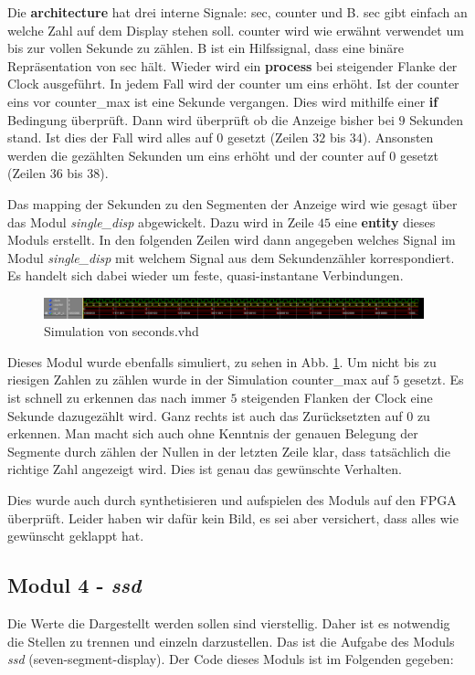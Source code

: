 Die \textbf{architecture} hat drei interne Signale: sec, counter und B.
sec gibt einfach an welche Zahl auf dem Display stehen soll.
counter wird wie erwähnt verwendet um bis zur vollen Sekunde zu zählen.
B ist ein Hilfssignal, dass eine binäre Repräsentation von sec hält.
Wieder wird ein \textbf{process} bei steigender Flanke der Clock ausgeführt.
In jedem Fall wird der counter um eins erhöht.
Ist der counter eins vor counter\_max ist eine Sekunde vergangen.
Dies wird mithilfe einer \textbf{if} Bedingung überprüft.
Dann wird überprüft ob die Anzeige bisher bei $9$ Sekunden stand.
Ist dies der Fall wird alles auf $0$ gesetzt (Zeilen $32$ bis $34$).
Ansonsten werden die gezählten Sekunden um eins erhöht und der counter auf $0$ gesetzt (Zeilen $36$ bis $38$).

Das mapping der Sekunden zu den Segmenten der Anzeige wird wie gesagt über das Modul \textit{single\_disp} abgewickelt.
Dazu wird in Zeile $45$ eine \textbf{entity} dieses Moduls erstellt.
In den folgenden Zeilen wird dann angegeben welches Signal im Modul \textit{single\_disp} mit welchem Signal aus dem Sekundenzähler korrespondiert.
Es handelt sich dabei wieder um feste, quasi-instantane Verbindungen.

\begin{figure}[ht]
	\centering
    \includegraphics[width=0.98\textwidth]{../Daten/seconds2.png}
	\caption{Simulation von seconds.vhd}
	\label{img_seconds}
\end{figure}

Dieses Modul wurde ebenfalls simuliert, zu sehen in Abb. \ref{img_seconds}.
Um nicht bis zu riesigen Zahlen zu zählen wurde in der Simulation counter\_max auf $5$ gesetzt.
Es ist schnell zu erkennen das nach immer $5$ steigenden Flanken der Clock eine Sekunde dazugezählt wird.
Ganz rechts ist auch das Zurücksetzten auf $0$ zu erkennen.
Man macht sich auch ohne Kenntnis der genauen Belegung der Segmente durch zählen der Nullen in der letzten Zeile klar, dass tatsächlich die richtige Zahl angezeigt wird.
Dies ist genau das gewünschte Verhalten.

Dies wurde auch durch synthetisieren und aufspielen des Moduls auf den FPGA überprüft.
Leider haben wir dafür kein Bild, es sei aber versichert, dass alles wie gewünscht geklappt hat.

\subsection{Modul 4 - \textit{ssd}}
Die Werte die Dargestellt werden sollen sind vierstellig.
Daher ist es notwendig die Stellen zu trennen und einzeln darzustellen.
Das ist die Aufgabe des Moduls \textit{ssd} (seven-segment-display). Der Code dieses Moduls ist im Folgenden gegeben:

